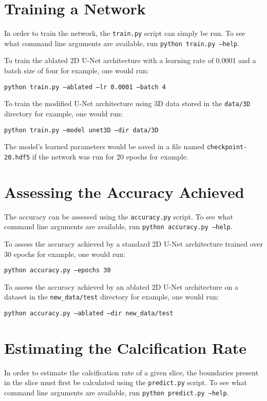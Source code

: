 \section{Training a Network}

In order to train the network, the \texttt{train.py} script can simply be run. To see what command line arguments are available, run \texttt{python train.py --help}.

To train the ablated 2D U-Net architecture with a learning rate of 0.0001 and a batch size of four for example, one would run:

\texttt{python train.py --ablated --lr 0.0001 --batch 4}

To train the modified U-Net architecture using 3D data stored in the \texttt{data/3D} directory for example, one would run:

\texttt{python train.py --model unet3D --dir data/3D}

The model's learned parameters would be saved in a file named \texttt{checkpoint-20.hdf5} if the network was run for 20 epochs for example.

\section{Assessing the Accuracy Achieved}

The accuracy can be assessed using the \texttt{accuracy.py} script. To see what command line arguments are available, run \texttt{python accuracy.py --help}.

To assess the accuracy achieved by a standard 2D U-Net architecture trained over 30 epochs for example, one would run:

\texttt{python accuracy.py --epochs 30}

To assess the accuracy achieved by an ablated 2D U-Net architecture on a dataset in the \texttt{new\_data/test} directory for example, one would run:

\texttt{python accuracy.py --ablated --dir new\_data/test}

\section{Estimating the Calcification Rate}

In order to estimate the calcification rate of a given slice, the boundaries present in the slice must first be calculated using the \texttt{predict.py} script. To see what command line arguments are available, run \texttt{python predict.py --help}.

